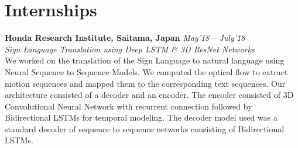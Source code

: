 \documentclass[margin,line, 9pt]{res}
\begin{document}
\section{\sc Internships}
%
{\bf Honda Research Institute, Saitama, Japan} \hfill {\it May'18 -- July'18} \\
\emph{Sign Language Translation using Deep LSTM \& 3D ResNet Networks} \\
We worked on the translation of the Sign Language to natural language using Neural Sequence to Sequence Models. We computed the optical flow to extract motion sequences and mapped them to the corresponding text sequences. Our architecture consisted of a decoder and an encoder. The encoder consisted of 3D Convolutional Neural Network with recurrent connection followed by Bidirectional LSTMs for temporal modeling. The decoder model used was a standard decoder of sequence to sequence networks consisting of Bidirectional LSTMs.
% 
\vspace{-.35in} \\
\end{document}
